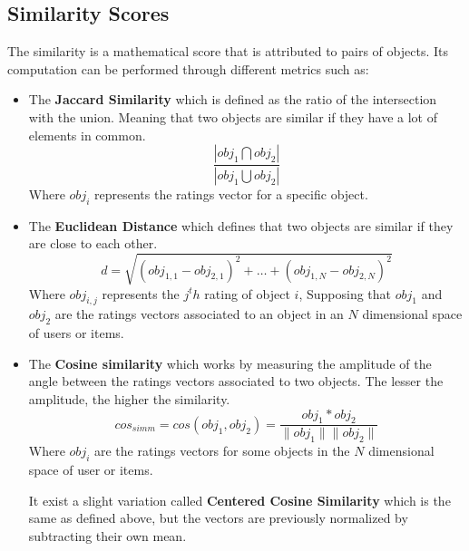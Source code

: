 \subsection{Similarity Scores}
The similarity
is a mathematical score that is attributed to pairs of objects. Its 
computation can be performed through different metrics such as:
\begin{itemize}
		\item The \textbf{Jaccard Similarity} which is defined as the ratio
		      of the intersection with the union. Meaning that two objects are
			  similar if they have a lot of elements in common.
			  \begin{equation}
				\frac{|obj_{1} \bigcap obj_{2}|}{|obj_{1} \bigcup obj_{2}|}
			  \end{equation}
			  Where $obj_{i}$ represents the ratings vector for a specific
			  object.
		\item The \textbf{Euclidean Distance} which defines that two objects
		      are similar if they are close to each other.
			  \begin{equation}
				d = \sqrt{(obj_{1,1}-obj_{2,1})^{2} + \dots +
						  (obj_{1,N}-obj_{2,N})^{2}}
			  \end{equation}
			  Where $obj_{i, j}$ represents the $j^th$ rating of object $i$,
			  Supposing that $obj_{1}$ and $obj_{2}$ are the ratings vectors
			  associated to an object in an $N$ dimensional space of users or
			  items.
		\item The \textbf{Cosine similarity} which works by measuring the
		      amplitude of the angle between the ratings vectors associated to
			  two objects.
		      The lesser the amplitude, the higher the similarity.
			  \begin{equation}
				cos_{simm} = cos(obj_{1}, obj_{2})
						   = \frac{obj_{1}*obj_{2}}{\|obj_{1}\|\|obj_{2}\|}
			  \end{equation}
			  Where $obj_{i}$ are the ratings vectors for some objects in the
			  $N$ dimensional space of user or items.

			  It exist a slight variation called 
			  \textbf{Centered Cosine Similarity} which is the same as defined
			  above, but the vectors are previously normalized by subtracting
			  their own mean.
\end{itemize}
